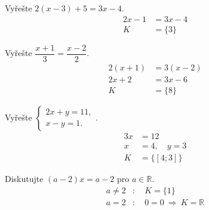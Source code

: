 \documentclass[11pt,a4paper]{article}
\begin{document}
\begin{zadaniReseniBox}[title={Samostatná práce 1}]
Vyřešte $2(x-3)+5=3x-4$.
\tcblower
\[
\begin{aligned}
2x-1&=3x-4\\
K&=\{3\}
\end{aligned}
\]

\end{zadaniReseniBox}
\begin{zadaniReseniBox}[title={Samostatná práce 2}]
Vyřešte $\dfrac{x+1}{3}=\dfrac{x-2}{2}$.
\tcblower
\[
\begin{aligned}
2(x+1)&=3(x-2)\\
2x+2&=3x-6\\
K&=\{8\}
\end{aligned}
\]

\end{zadaniReseniBox}
\begin{zadaniReseniBox}[title={Samostatná práce 3}]
Vyřešte $\begin{cases}2x+y=11,\\x-y=1.\end{cases}$.
\tcblower
\[
\begin{aligned}
3x&=12\\
x&=4,\quad y=3\\
K&=\{[4;3]\}
\end{aligned}
\]

\end{zadaniReseniBox}
\begin{zadaniReseniBox}[title={Samostatná práce 4}]
Diskutujte $(a-2)x=a-2$ pro $a\in\mathbb R$.
\tcblower
\[
\begin{aligned}
a\ne2&:\quad K=\{1\}\\
a=2&:\quad 0=0\ \Rightarrow\ K=\mathbb R
\end{aligned}
\]

\end{zadaniReseniBox}
\end{document}
